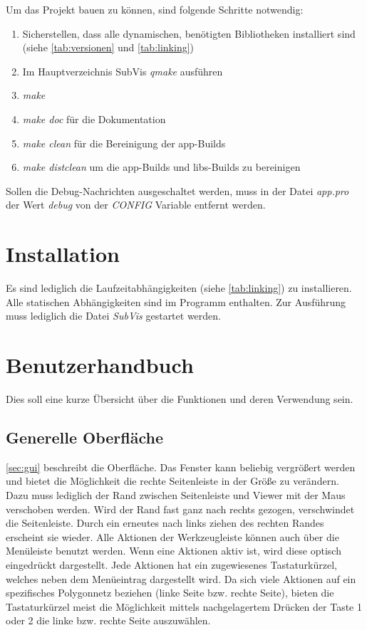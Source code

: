 Um das Projekt bauen zu können, sind folgende Schritte notwendig:

\begin{enumerate}
\item Sicherstellen, dass alle dynamischen, benötigten Bibliotheken installiert sind (siehe \autoref{tab:versionen} und \autoref{tab:linking})
\item Im Hauptverzeichnis SubVis \emph{qmake} ausführen
\item \emph{make}
\item \emph{make doc} für die Dokumentation
\item \emph{make clean} für die Bereinigung der app-Builds
\item \emph{make distclean} um die app-Builds und libs-Builds zu bereinigen
\end{enumerate}

Sollen die Debug-Nachrichten ausgeschaltet werden, muss in der Datei \emph{app.pro} der Wert \emph{debug} von der \emph{CONFIG} Variable entfernt werden.

\section{Installation}

Es sind lediglich die Laufzeitabhängigkeiten (siehe \autoref{tab:linking}) zu installieren. 
Alle statischen Abhängigkeiten sind im Programm enthalten.
Zur Ausführung muss lediglich die Datei \emph{SubVis} gestartet werden.

\section{Benutzerhandbuch}

Dies soll eine kurze Übersicht über die Funktionen und deren Verwendung sein.

\subsection{Generelle Oberfläche}

\autoref{sec:gui} beschreibt die Oberfläche. 
Das Fenster kann beliebig vergrößert werden und bietet die Möglichkeit die rechte Seitenleiste in der Größe zu verändern. 
Dazu muss lediglich der Rand zwischen Seitenleiste und Viewer mit der Maus verschoben werden.
Wird der Rand fast ganz nach rechts gezogen, verschwindet die Seitenleiste.
Durch ein erneutes nach links ziehen des rechten Randes erscheint sie wieder.
Alle Aktionen der Werkzeugleiste können auch über die Menüleiste benutzt werden.
Wenn eine Aktionen aktiv ist, wird diese optisch eingedrückt dargestellt.
Jede Aktionen hat ein zugewiesenes Tastaturkürzel, welches neben dem Menüeintrag dargestellt wird.
Da sich viele Aktionen auf ein spezifisches Polygonnetz beziehen (linke Seite bzw. rechte Seite), bieten die Tastaturkürzel meist die Möglichkeit mittels nachgelagertem Drücken der Taste 1 oder 2 die linke bzw. rechte Seite auszuwählen.

